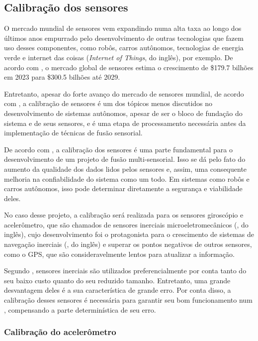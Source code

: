\documentclass[acronym, symbols, table]{fei}
\begin{document}
		\subsection{Calibração dos sensores}\label{sec:calibracao_sensores}
		
		O mercado mundial de sensores vem expandindo numa alta taxa ao longo dos últimos anos empurrado pelo desenvolvimento de outras tecnologias que fazem uso desses componentes, como robôs, carros autônomos, tecnologias de energia verde e internet das coisas (\textit{Internet of Things}, do inglês), por exemplo. De acordo com \textcite{sensor_market}, o mercado global de sensores estima o crescimento de \$179.7 bilhões em 2023 para \$300.5 bilhões até 2029.
		
		Entretanto, apesar do forte avanço do mercado de sensores mundial, de acordo com \textcite{calibration_av}, a calibração de sensores é um dos tópicos menos discutidos no desenvolvimento de sistemas autônomos, apesar de ser o bloco de fundação do sistema e de seus sensores, e é uma etapa de processamento necessária antes da implementação de técnicas de fusão sensorial.
		
		De acordo com \textcite{lv2020targetless}, a calibração dos sensores é uma parte fundamental para o desenvolvimento de um projeto de fusão multi-sensorial. Isso se dá pelo fato do aumento da qualidade dos dados lidos pelos sensores e, assim, uma consequente melhoria na confiabilidade do sistema como um todo. Em sistemas como robôs e carros autônomos, isso pode determinar diretamente a segurança e viabilidade deles.
		
		No caso desse projeto, a calibração será realizada para os sensores giroscópio e acelerômetro, que são chamados de sensores inerciais microeletromecânicos (, do inglês), cujo desenvolvimento foi o protagonista para o crescimento de sistemas de navegação inerciais (, do inglês) e superar os pontos negativos de outros sensores, como o GPS, que são consideravelmente lentos para atualizar a informação.
		
		Segundo \textcite{9181212}, sensores inerciais  são utilizados preferencialmente por conta tanto do seu baixo custo quanto do seu reduzido tamanho. Entretanto, uma grande desvantagem deles é a sua característica de grande erro. Por conta disso, a calibração desses sensores é necessária para garantir seu bom funcionamento num , compensando a parte determinística de seu erro.
		
			\subsubsection{Calibração do acelerômetro} \label{sec:calibracao_acelerometro}
			
\end{document}
